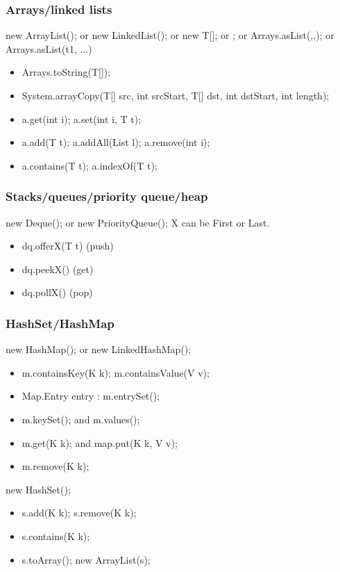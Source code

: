 \documentclass[10pt]{article}
\begin{document}
\subsubsection{Arrays/linked lists}
new ArrayList(); or new LinkedList(); or new T[]; or {}; or Arrays.asList(,,); or Arrays.asList(t1, ...)
\begin{itemize}
    \itemsep0em
    \item Arrays.toString(T[]);
    \item System.arrayCopy(T[] src, int srcStart, T[] dst, int dstStart, int length);
    \item a.get(int i); a.set(int i, T t);
    \item a.add(T t); a.addAll(List l); a.remove(int i);
    \item a.contains(T t); a.indexOf(T t);
\end{itemize}
\subsubsection{Stacks/queues/priority queue/heap}
new Deque(); or new PriorityQueue();
X can be First or Last.
\begin{itemize}
    \itemsep0em
    \item dq.offerX(T t) (push)
    \item dq.peekX() (get)
    \item dq.pollX() (pop)
\end{itemize}
\subsubsection{HashSet/HashMap}
new HashMap(); or new LinkedHashMap();
\begin{itemize}
    \itemsep0em
    \item m.containsKey(K k); m.containsValue(V v);
    \item Map.Entry entry : m.entrySet();
    \item m.keySet(); and m.values();
    \item m.get(K k); and map.put(K k, V v);
    \item m.remove(K k);
\end{itemize}
new HashSet();
\begin{itemize}
    \itemsep0em
    \item s.add(K k); s.remove(K k);
    \item s.contains(K k);
    \item s.toArray(); new ArrayList(s);
\end{itemize}
\end{document}
